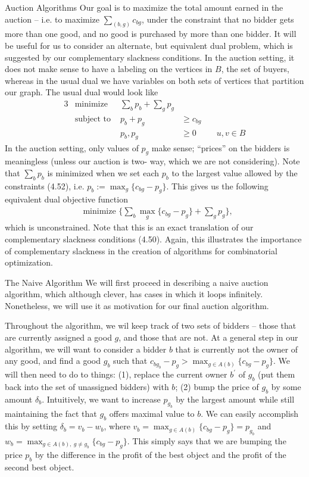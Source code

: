 \begin{section}{Auction Algorithms}
	Our goal is to maximize the total amount earned in the auction -- i.e. to 
	maximize $\sum_{(b,g)} c_{bg}$, under the constraint that no bidder gets more than one good, 
	and no good is purchased by more than one bidder.
	It will be useful for us to consider an alternate, but equivalent dual problem, which is 
	suggested by our complementary slackness conditions. In the auction setting, it does not make 
	sense to have a labeling on the vertices in $B$, the set of buyers, whereas in the usual dual we 
	have variables on both sets of vertices that partition our graph. The usual dual would look 
	like
	\begin{alignat}{3}
		& \text{minimize } & \sum_{b} p_b + \sum_{g} p_g & \\
		& \text{subject to } & p_b + p_g & \geq c_{bg} \\
				     && p_b,p_g & \geq 0 & \quad u,v\in B
	\end{alignat}
	In the auction setting, only 
	values of $p_g$ make sense; ``prices'' on the bidders is meaningless (unless our auction is two-
	way, which we are not considering). Note that $\sum_b p_b$ is minimized when we set each $p_b$ 
	to the largest value allowed by the constraints (4.52), i.e. $p_b := \max_g \{c_{bg} - p_g\}$. 
	This gives us the following equivalent dual objective function 
	\begin{align}
		&\text{minimize }\{ \sum_b \max_g \{c_{bg} - p_g\} + \sum_g p_g\},
	\end{align}
	which is unconstrained. Note that this is an exact translation of our complementary slackness 
	conditions (4.50). Again, this illustrates the importance of complementary slackness in the 
	creation of algorithms for combinatorial optimization.\\
	\begin{subsection}{The Naive Algorithm}
		We will first proceed in describing a naive auction algorithm, which although clever, 
		has cases in which it loops infinitely. Nonetheless, we will use it as motivation for 
		our final auction algorithm.

		Throughout the algorithm, we wil keep track of two sets of bidders -- those that are 
		currently assigned a good $g$, and those that are not. At a general step in our 
		algorithm, we will want to consider a bidder $b$ that is currently not the owner of any 
		good, and find a good $g_b$ such that  $c_{bg_b} - p_g > \max_{g\in A(b)}  \{c_{bg} - 
		p_g\}$. 
		We will then need to do to things: (1), replace the current owner $b^{'}$ of $g_b$ 
		(put them back into the set of unassigned bidders) with $b$; (2) bump the price of $g_b$ 
		by some amount $\delta_b$. Intuitively, we want to increase $p_{g_b}$ by the largest 
		amount while still maintaining the fact that $g_b$ offers maximal value to $b$. We can 
		easily accomplish this by setting $\delta_b = v_b - w_b$, where $v_b = \max_{g\in A(b)} 
		\{c_{bg} - p_g\} = p_{g_b}$ and $w_b = \max_{g\in A(b),\ g\neq g_b} \{c_{bg} - p_g\}$. 
		This simply says that we are bumping the price $p_b$ by the difference in the profit of 
		the best object and the profit of the second best object.


\end{subsection}
\end{section}
